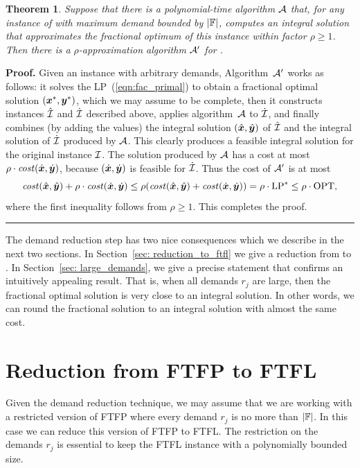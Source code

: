 \documentclass[oneside,final]{ucr}
\newtheorem{theorem}{Theorem}
\newenvironment{proof}[1][Proof]{\textbf{#1.} }{\ \rule{0.5em}{0.5em}}
\begin{document}

\begin{theorem}\label{thm: reduction to polynomial}
  Suppose that there is a polynomial-time algorithm $\calA$
  that, for any instance of {\FTFP} with maximum demand
  bounded by $|\mathbb{F}|$, computes an integral solution
  that approximates the fractional optimum of this instance
  within factor $\rho\geq 1$.  Then there is a
  $\rho$-approximation algorithm $\calA'$ for {\FTFP}.
\end{theorem}
\begin{proof}
  Given an {\FTFP} instance with arbitrary demands,
  Algorithm~$\calA'$ works as follows: it solves the
  LP~(\ref{eqn:fac_primal}) to obtain a fractional optimal
  solution $(\boldsymbol{x}^\ast,\boldsymbol{y}^\ast)$, which we may assume to
  be complete, then it constructs instances $\hatcalI$ and
  $\dotcalI$ described above, applies algorithm~$\calA$ to
  $\dotcalI$, and finally combines (by adding the values)
  the integral solution $(\hat{\boldsymbol{x}}, \hat{\boldsymbol{y}})$ of $\hatcalI$
  and the integral solution of $\dotcalI$ produced by
  $\calA$. This clearly produces a feasible integral
  solution for the original instance $\mathcal{I}$.  The solution
  produced by $\calA$ has a cost at most
  $\rho\cdot{\it cost}(\dot{\boldsymbol{x}},\dot{\boldsymbol{y}})$, because
  $(\dot{\boldsymbol{x}},\dot{\boldsymbol{y}})$ is feasible for $\dotcalI$. Thus the
  cost of $\calA'$ is at most
% 
\begin{equation*}
 {\it cost}(\hat{\boldsymbol{x}}, \hat{\boldsymbol{y}}) + \rho\cdot{\it cost}(\dot{\boldsymbol{x}},\dot{\boldsymbol{y}})
	\le
 \rho({\it cost}(\hat{\boldsymbol{x}}, \hat{\boldsymbol{y}}) + {\it cost}(\dot{\boldsymbol{x}},\dot{\boldsymbol{y}}))
		= \rho\cdot\mbox{\rm LP}^\ast \le \rho\cdot\mbox{\rm OPT},
\end{equation*}
%
where the first inequality follows from $\rho\geq 1$. This completes
the proof.
\end{proof}

The demand reduction step has two nice consequences which we
describe in the next two sections. In Section~\ref{sec:
  reduction_to_ftfl} we give a reduction from {\FTFP} to
{\FTFL}. In Section~\ref{sec: large_demands}, we give a
precise statement that confirms an intuitively appealing
result. That is, when all demands $r_j$ are large, then the
fractional optimal solution is very close to an integral
solution. In other words, we can round the fractional
solution to an integral solution with almost the same cost.


\section{Reduction from FTFP to FTFL}
\label{sec: reduction_to_ftfl}
Given the demand reduction technique, we may assume that we
are working with a restricted version of FTFP where every
demand $r_j$ is no more than $|\mathbb{F}|$. In this case we
can reduce this version of FTFP to FTFL. The restriction on
the demands $r_j$ is essential to keep the FTFL instance
with a polynomially bounded size.  
\end{document}
